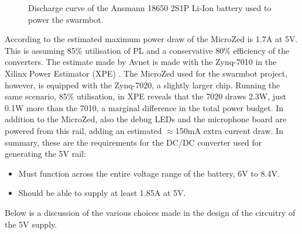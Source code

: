 \begin{figure}
	\centering
	
	\caption{Discharge curve of the Ansmann 18650 2S1P Li-Ion battery used to power the swarmbot.}
	\label{fig:discharge_repeat}
\end{figure}
According to \cite{microzed_hardware_guide} the estimated maximum power draw of the MicroZed is 1.7A at 5V.
This is assuming 85\% utilisation of PL and a conservative 80\% efficiency of the converters.
The estimate made by Avnet is made with the Zynq-7010 in the Xilinx Power Estimator (XPE) \cite{xpe}.
The MicroZed used for the swarmbot project, however, is equipped with the Zynq-7020, a slightly larger chip.
Running the same scenario, 85\% utilisation, in XPE reveals that the 7020 draws 2.3W, just 0.1W more than the 7010, a marginal difference in the total power budget.
In addition to the MicroZed, also the debug LEDs and the microphone board are powered from this rail, adding an estimated $\approx$150mA extra current draw.
In summary, these are the requirements for the DC/DC converter used for generating the 5V rail:

\begin{itemize}
	\item Must function across the entire voltage range of the battery, 6V to 8.4V.
	\item Should be able to supply at least 1.85A at 5V.
\end{itemize}

Below is a discussion of the various choices made in the design of the circuitry of the 5V supply.

